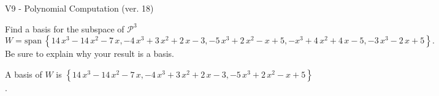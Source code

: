 \begin{exercise}
  \begin{exerciseTitle}V9 - Polynomial Computation (ver. 18)\end{exerciseTitle}
  \begin{exerciseStatement}
    Find a basis for the subspace of \(\mathcal{P}^3\) 
\[W=\mathrm{span}\ \left\{14 \, x^{3} - 14 \, x^{2} - 7 \, x , -4 \, x^{3} + 3 \, x^{2} + 2 \, x - 3 , -5 \, x^{3} + 2 \, x^{2} - x + 5 , -x^{3} + 4 \, x^{2} + 4 \, x - 5 , -3 \, x^{3} - 2 \, x + 5\right\}.\]
 Be sure to explain why your result is a basis.


  \end{exerciseStatement}
  \begin{exerciseAnswer}
   A basis of \(W\) is  \(\left\{14 \, x^{3} - 14 \, x^{2} - 7 \, x , -4 \, x^{3} + 3 \, x^{2} + 2 \, x - 3 , -5 \, x^{3} + 2 \, x^{2} - x + 5\right\}\).
  


  \end{exerciseAnswer}
\end{exercise}